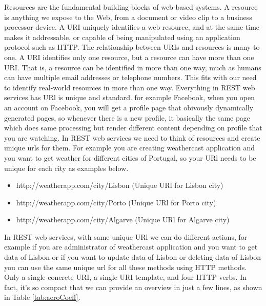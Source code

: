 Resources are the fundamental building blocks of web-based systems. A resource is anything we expose to the Web,
from a document or video clip to a business processor device. A URI uniquely identifies a web resource, and at the
same time makes it addressable, or capable of being manipulated using an application protocol such as HTTP. The
relationship between URIs and resources is many-to-one. A URI identifies only one resource, but a resource can
have more than one URI. That is, a resource can be identified in more than one way, much as humans can have multiple
email addresses or telephone numbers. This fits with our  need to identify real-world resources in more
than one way. Everything in REST web services has URl is unique and standard. for example Facebook, when you open an
account on Facebook, you will get a profile page that obivously dynamically generated pages, so whenever there is a
new profile, it basically the same page which does same processing but render different content depending on profile
that you are watching. In REST web services we need to think of resources and create unique urls for them. For example you are creating weathercast application and you want
to get weather for different cities of Portugal, so your URl needs to be unique for each city as examples below.\\

\begin{itemize}
  \item http://weatherapp.com/city/Lisbon (Unique URl for Lisbon city)
  \item http://weatherapp.com/city/Porto (Unique URl for Porto city)
  \item http://weatherapp.com/city/Algarve (Unique URl for Algarve city)
\end{itemize}

In REST web services, with same unique URl we can do different actions, for example if you are administrator of weathercast
application and you want to get data of Lisbon or if you want to update data of Lisbon or deleting data of Lisbon you can
use the same unique url for all these methods using HTTP methods. Only a single concrete URI, a single URI template,
and four HTTP verbs. In fact, it’s so compact that we can provide an overview in just a few lines, as shown in Table \ref{tab:aeroCoeff}.

